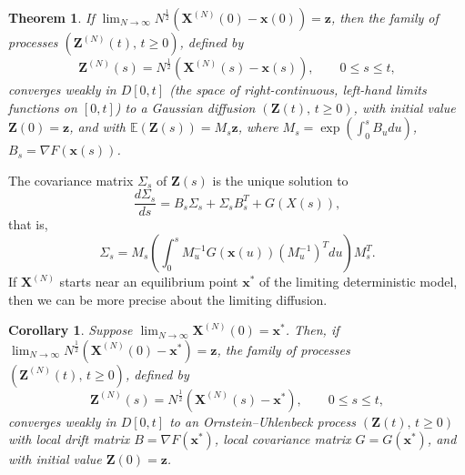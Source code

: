 \documentclass[12pt]{article}
\newtheorem{theorem}{Theorem}
\newtheorem{corollary}{Corollary}
\newcommand{\OU}{Ornstein--Uhlenbeck}
\newcommand\E{\ensuremath{\mathbb{E}}}
\newcommand{\bz}{\boldsymbol{z}}
\newcommand{\bZ}{\boldsymbol{Z}}
\newcommand{\bXN}{\boldsymbol{X}^{(N)}}
\newcommand{\bZN}{\boldsymbol{Z}^{(N)}}
\newcommand{\bx}{\boldsymbol{x}}
\begin{document}
\begin{theorem}
\label{CLT}
If $\lim_{N \to \infty} N^{\frac12} \left(\bXN(0)-\bx(0) \right)=\bz$,
then the family of processes $(\bZN(t),\, t\geq 0)$, defined by
$$
\bZN(s)=N^{\frac12} \left(\bXN(s)-\bx(s) \right),
\qquad 0\leq s \leq t,
$$
converges weakly in $D[0,t]$
(the space of right-continuous, left-hand limits functions on $[0,t]$)
to a Gaussian diffusion $(\bZ(t),\, t\geq 0)$, with initial value $\bZ(0)=\bz$,
and with $\E(\bZ(s))=M_s \bz$, where
$M_s=\exp \left( \int_0^s B_u du \right)$, $B_s=\nabla F(\bx(s))$.
\end{theorem}

\noindent
The covariance matrix $\Sigma_s$ of $\bZ(s)$ is the unique solution to
$$
\frac{d\Sigma_s}{ds} = B_s \Sigma_s  +\Sigma_s  B_s ^T+G(X(s)),
$$
that is,
$$
\Sigma_s=M_s\left( \int_0^s M_u^{-1} G(\bx(u)) (M_u^{-1})^T du \right) M_s^T.
$$
If $\bXN$ starts near an equilibrium point $\bx^*$
of the limiting deterministic model, 
then we can be more precise about the limiting diffusion.

\begin{corollary}
\label{CLTOU}
Suppose $\lim_{N \to \infty} \bXN(0)=\bx^*$. Then, if
$\lim_{N \to \infty} N^{\frac12} \left(\bXN(0)-\bx^* \right)=\bz$,
the family of processes $(\bZN(t),\, t\geq 0)$, defined by
$$
\bZN(s)=N^{\frac12} \left(\bXN(s)-\bx^* \right), \qquad 0\leq s\leq t,
$$
converges weakly in $D[0,t]$ to an {\OU} process $(\bZ(t),\, t\geq 0)$
with local drift matrix $B=\nabla F(\bx^*)$, local covariance matrix
$G=G(\bx^*)$, and with initial value $\bZ(0)=\bz$.
\end{corollary}
\end{document}
